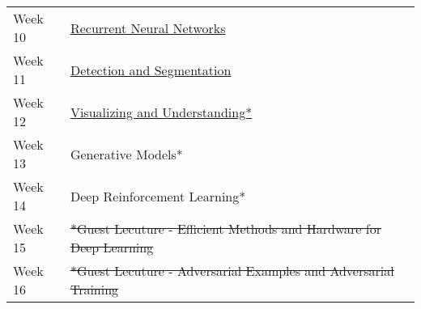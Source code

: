 \documentclass[10pt]{article}
\begin{document}
\begin{longtable}[]{@{}ll@{}}
\begin{minipage}[t]{0.47\columnwidth}\raggedright
Week 10\strut
\end{minipage} & \begin{minipage}[t]{0.47\columnwidth}\raggedright
\href{https://github.com/kdha0727/CS231N/blob/master/Lecture\%2010\%20RNN.pdf}{Recurrent
Neural Networks}\strut
\end{minipage}\tabularnewline
\begin{minipage}[t]{0.47\columnwidth}\raggedright
Week 11\strut
\end{minipage} & \begin{minipage}[t]{0.47\columnwidth}\raggedright
\href{https://github.com/kdha0727/CS231N/blob/master/Lecture\%2011\%20Detection\%20and\%20Segmentation.pdf}{Detection
and Segmentation}\strut
\end{minipage}\tabularnewline
\begin{minipage}[t]{0.47\columnwidth}\raggedright
Week 12\strut
\end{minipage} & \begin{minipage}[t]{0.47\columnwidth}\raggedright
\href{https://github.com/kdha0727/CS231N/blob/master/Lecture\%2012\%20Visualizing\%20and\%20Understanding.pdf}{Visualizing
and Understanding*}\strut
\end{minipage}\tabularnewline
\begin{minipage}[t]{0.47\columnwidth}\raggedright
Week 13\strut
\end{minipage} & \begin{minipage}[t]{0.47\columnwidth}\raggedright
Generative Models*\strut
\end{minipage}\tabularnewline
\begin{minipage}[t]{0.47\columnwidth}\raggedright
Week 14\strut
\end{minipage} & \begin{minipage}[t]{0.47\columnwidth}\raggedright
Deep Reinforcement Learning*\strut
\end{minipage}\tabularnewline
\begin{minipage}[t]{0.47\columnwidth}\raggedright
Week 15\strut
\end{minipage} & \begin{minipage}[t]{0.47\columnwidth}\raggedright
\sout{*Guest Lecuture - Efficient Methods
and Hardware for Deep Learning}\strut
\end{minipage}\tabularnewline
\begin{minipage}[t]{0.47\columnwidth}\raggedright
Week 16\strut
\end{minipage} & \begin{minipage}[t]{0.47\columnwidth}\raggedright
\sout{*Guest Lecuture - Adversarial Examples
and Adversarial Training}\strut
\end{minipage}\tabularnewline
\bottomrule
\end{longtable}
    
\end{document}
